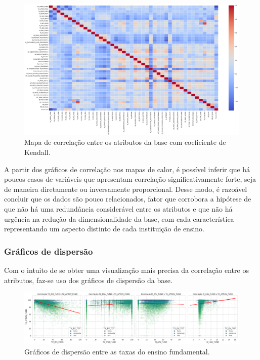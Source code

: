 \begin{figure}[H]
    \centering
    \includegraphics[scale = 0.25]{Graphics/Heatmap-Kendall.png}
    \caption{Mapa de correlação entre os atributos da base com coeficiente de Kendall.}
    \label{fig:heatmap}
\end{figure}

\par A partir dos gráficos de correlação nos mapas de calor, é possível inferir que há poucos casos de variáveis que apresentam correlação significativamente forte, seja de maneira diretamente ou inversamente proporcional. Desse modo, é razoável concluir que os dados são pouco relacionados, fator que corrobora a hipótese de que não há uma redundância considerável entre os atributos e que não há urgência na redução da dimensionalidade da base, com cada característica representando um aspecto distinto de cada instituição de ensino.

\subsubsection{Gráficos de dispersão}

Com o intuito de se obter uma visualização mais precisa da correlação entre os atributos, faz-se uso dos gráficos de dispersão da base.

\begin{figure}[H]
    \centering
    \includegraphics[scale = 0.3]{Graphics/Disp-Fund.png}
    \caption{Gráficos de dispersão entre as taxas do ensino fundamental.}
    \label{fig:disp-fund}
\end{figure}

